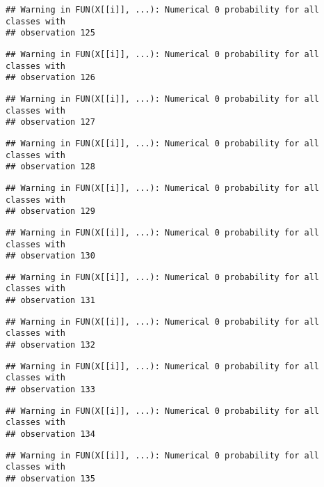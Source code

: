 \documentclass[
]{article}
\begin{document}
\begin{verbatim}
## Warning in FUN(X[[i]], ...): Numerical 0 probability for all classes with
## observation 125
\end{verbatim}

\begin{verbatim}
## Warning in FUN(X[[i]], ...): Numerical 0 probability for all classes with
## observation 126
\end{verbatim}

\begin{verbatim}
## Warning in FUN(X[[i]], ...): Numerical 0 probability for all classes with
## observation 127
\end{verbatim}

\begin{verbatim}
## Warning in FUN(X[[i]], ...): Numerical 0 probability for all classes with
## observation 128
\end{verbatim}

\begin{verbatim}
## Warning in FUN(X[[i]], ...): Numerical 0 probability for all classes with
## observation 129
\end{verbatim}

\begin{verbatim}
## Warning in FUN(X[[i]], ...): Numerical 0 probability for all classes with
## observation 130
\end{verbatim}

\begin{verbatim}
## Warning in FUN(X[[i]], ...): Numerical 0 probability for all classes with
## observation 131
\end{verbatim}

\begin{verbatim}
## Warning in FUN(X[[i]], ...): Numerical 0 probability for all classes with
## observation 132
\end{verbatim}

\begin{verbatim}
## Warning in FUN(X[[i]], ...): Numerical 0 probability for all classes with
## observation 133
\end{verbatim}

\begin{verbatim}
## Warning in FUN(X[[i]], ...): Numerical 0 probability for all classes with
## observation 134
\end{verbatim}

\begin{verbatim}
## Warning in FUN(X[[i]], ...): Numerical 0 probability for all classes with
## observation 135
\end{verbatim}
\end{document}
